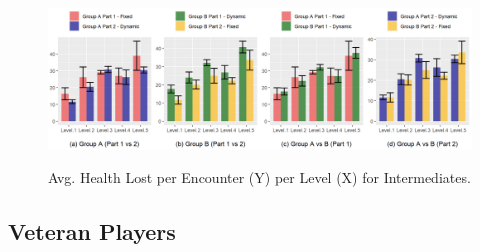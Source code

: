 \begin{figure}[!ht]
    \begin{center}
    \caption{Avg. Health Lost per Encounter (Y) per Level (X) for Intermediates.}
        \includegraphics[width=34em]{figures/health_lost_per_encounter-intermediate_players.png}
        \label{fig:result-metric-intermediates-health-lost-per-encounter}
    \end{center}
\end{figure}


\subsection{Veteran Players}



